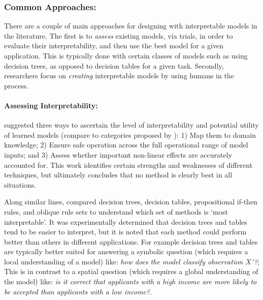 \subsubsection{Common Approaches:}
There are a couple of main approaches for designing with interpretable models in the literature. The first is to \emph{assess} existing models, via trials, in order to evaluate their interpretability, and then use the best model for a given application. This is typically done with certain classes of models such as  using decision trees, as opposed to decision tables for a given task. Secondly, researchers focus on \emph{creating} interpretable models by using humans in the process. 

\paragraph{Assessing Interpretability:}
\citet{Van_Belle2013-ph} suggested three ways to ascertain the level of interpretability and potential utility of learned models (compare to categories proposed by \citet{Lipton2016-ug}): 1) Map them to domain knowledge; 2) Ensure safe operation across the full operational range of model inputs; and 3) Assess whether important non-linear effects are accurately accounted for. This work identifies certain strengths and weaknesses of different techniques, but ultimately concludes that no method is clearly best in all situations. 

Along similar lines, \citet{Huysmans2011-th} compared decision trees, decision tables, propositional if-then rules, and oblique rule sets to understand which set of methods is `most interpretable'. It was experimentally determined that decision trees and tables tend to be easier to interpret, but it is noted that each method could perform better than others in different applications. For example decision trees and tables are typically better suited for answering a symbolic question (which requires a local understanding of a model) like: \emph{how does the model classify observation $X$'?}; This is in contrast to a spatial question (which requires a global understanding of the model) like: \emph{is it correct that applicants with a high income are more likely to be accepted than applicants with a low income?}.

